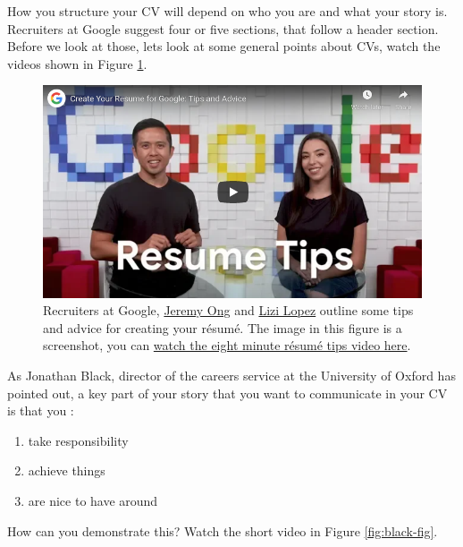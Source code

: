 \documentclass[
]{book}
\providecommand{\tightlist}{%
  \setlength{\itemsep}{0pt}\setlength{\parskip}{0pt}}
\begin{document}
How you structure your CV will depend on who you are and what your story is. Recruiters at Google suggest four or five sections, that follow a header section. Before we look at those, lets look at some general points about CVs, watch the videos shown in Figure \ref{fig:lopez-fig}.

\begin{figure}

{\centering \includegraphics[width=0.99\linewidth]{images/youtube-google-recruiters} 

}

\caption{Recruiters at Google, \href{https://www.linkedin.com/in/jeremy-ong/}{Jeremy Ong} and \href{https://www.linkedin.com/in/lizilopez/}{Lizi Lopez} outline some tips and advice for creating your résumé. \citep{youtube-google-recruiters} The image in this figure is a screenshot, you can \href{https://www.youtube.com/watch?v=BYUy1yvjHxE}{watch the eight minute résumé tips video here}.}\label{fig:lopez-fig}
\end{figure}



As Jonathan Black, director of the careers service at the University of Oxford has pointed out, \citep{topnotchcv} a key part of your story that you want to communicate in your CV is that you :

\begin{enumerate}
\def\labelenumi{\arabic{enumi}.}
\tightlist
\item
  take responsibility
\item
  achieve things
\item
  are nice to have around
\end{enumerate}

How can you demonstrate this? Watch the short video in Figure \ref{fig:black-fig}.
\end{document}
